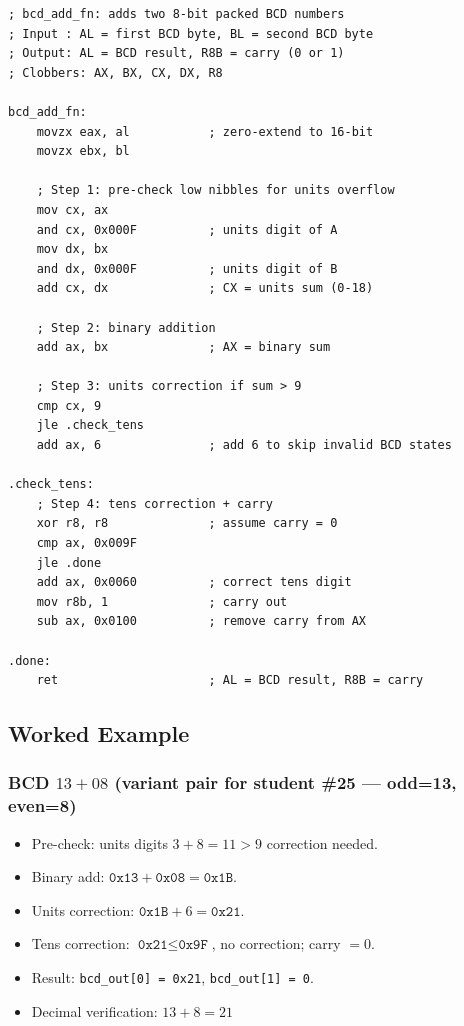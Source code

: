 \documentclass[12pt,a4paper]{article}
\newcommand{\code}[1]{\texttt{\small #1}}
\begin{document}
\begin{lstlisting}[caption={bcd\_add.asm --- full BCD addition program (macOS x86-64)}]
; bcd_add_fn: adds two 8-bit packed BCD numbers
; Input : AL = first BCD byte, BL = second BCD byte
; Output: AL = BCD result, R8B = carry (0 or 1)
; Clobbers: AX, BX, CX, DX, R8

bcd_add_fn:
    movzx eax, al           ; zero-extend to 16-bit
    movzx ebx, bl

    ; Step 1: pre-check low nibbles for units overflow
    mov cx, ax
    and cx, 0x000F          ; units digit of A
    mov dx, bx
    and dx, 0x000F          ; units digit of B
    add cx, dx              ; CX = units sum (0-18)

    ; Step 2: binary addition
    add ax, bx              ; AX = binary sum

    ; Step 3: units correction if sum > 9
    cmp cx, 9
    jle .check_tens
    add ax, 6               ; add 6 to skip invalid BCD states

.check_tens:
    ; Step 4: tens correction + carry
    xor r8, r8              ; assume carry = 0
    cmp ax, 0x009F
    jle .done
    add ax, 0x0060          ; correct tens digit
    mov r8b, 1              ; carry out
    sub ax, 0x0100          ; remove carry from AX

.done:
    ret                     ; AL = BCD result, R8B = carry
\end{lstlisting}

\subsection{Worked Example}

\subsubsection*{BCD $13 + 08$ (variant pair for student \#25 --- odd=13, even=8)}

\begin{itemize}
  \item Pre-check: units digits $3 + 8 = 11 > 9$ \quad correction needed.
  \item Binary add: $\texttt{0x13} + \texttt{0x08} = \texttt{0x1B}$.
  \item Units correction: $\texttt{0x1B} + 6 = \texttt{0x21}$.
  \item Tens correction: $\texttt{0x21} \leq \texttt{0x9F}$, no correction; carry $= 0$.
  \item Result: \code{bcd\_out[0] = 0x21}, \code{bcd\_out[1] = 0}.
  \item Decimal verification: $13 + 8 = 21$ \checkmark
\end{itemize}
\end{document}
